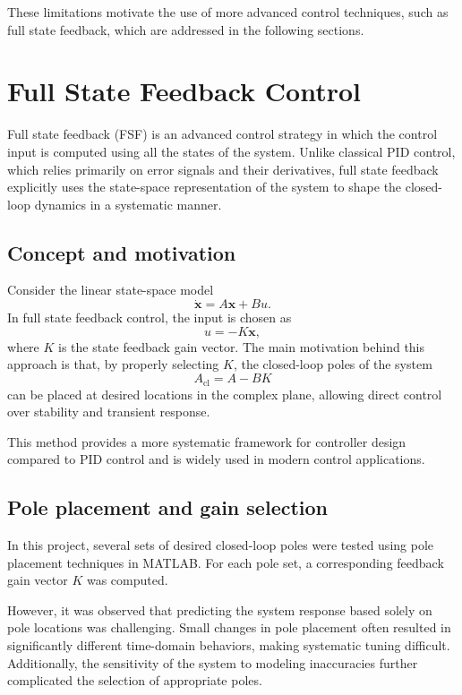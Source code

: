 \documentclass[12pt,a4paper]{article}
\begin{document}
These limitations motivate the use of more advanced control techniques, such as full state feedback, which are addressed in the following sections.


\section{Full State Feedback Control}

Full state feedback (FSF) is an advanced control strategy in which the control input is computed using all the states of the system. Unlike classical PID control, which relies primarily on error signals and their derivatives, full state feedback explicitly uses the state-space representation of the system to shape the closed-loop dynamics in a systematic manner.

\subsection{Concept and motivation}

Consider the linear state-space model
\[
\dot{\bm x} = A\bm x + B u.
\]
In full state feedback control, the input is chosen as
\[
u = -K \bm x,
\]
where $K$ is the state feedback gain vector. The main motivation behind this approach is that, by properly selecting $K$, the closed-loop poles of the system
\[
A_{\text{cl}} = A - BK
\]
can be placed at desired locations in the complex plane, allowing direct control over stability and transient response.

This method provides a more systematic framework for controller design compared to PID control and is widely used in modern control applications.

\subsection{Pole placement and gain selection}

In this project, several sets of desired closed-loop poles were tested using pole placement techniques in \textsc{MATLAB}. For each pole set, a corresponding feedback gain vector $K$ was computed.

However, it was observed that predicting the system response based solely on pole locations was challenging. Small changes in pole placement often resulted in significantly different time-domain behaviors, making systematic tuning difficult. Additionally, the sensitivity of the system to modeling inaccuracies further complicated the selection of appropriate poles.
\end{document}
